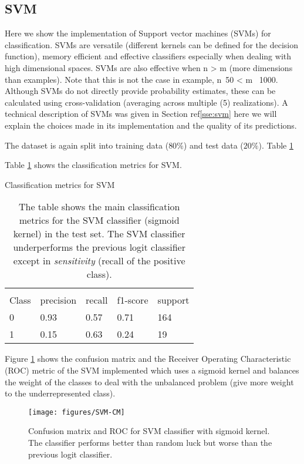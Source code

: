 \documentclass[11pt]{article}
\begin{document}
\subsection{SVM}
\label{se:ressvm}
Here we show the implementation of Support vector machines (SVMs) for classification. SVMs are versatile (different kernels can be defined for the decision function), memory efficient and effective classifiers especially when dealing with high dimensional spaces. SVMs are also effective when n > m (more dimensions than examples). Note that this is not the case in example, n~50 < m ~1000.
Although SVMs do not directly provide probability estimates, these can be calculated using cross-validation (averaging across multiple (5) realizations).
A technical description of SVMs was given in Section ref\ref{sse:svm} here we will explain the choices made in its implementation and the quality of its predictions.

The dataset is again split into training data ($80\%$) and test data ($20\%$). Table \ref{tab:svm}

Table \ref{tab:svm} shows the classification metrics for SVM.
\begin{table}[H]
\caption{Classification metrics for SVM} \label{tab:svm} 
\begin{center} 
\begin{tabular}{lllll}
\hline
\multicolumn{1}{c}{} \\
Class & precision & recall & f1-score & support     \\
\hline
0 & 0.93  &    0.57   &   0.71   &    164 \\
1 & 0.15  &    0.63   &   0.24   &    19 \\
\hline
\end{tabular}
\caption{The table shows the main classification metrics for the SVM classifier (sigmoid kernel) in the test set. The SVM classifier underperforms the previous logit classifier except in \emph{sensitivity} (recall of the positive class).}
\end{center}
\end{table}

Figure \ref{fig:svm-cm} shows the confusion matrix and the Receiver Operating Characteristic (ROC) metric of the SVM implemented which uses a sigmoid kernel and balances the weight of the classes to deal with the unbalanced problem (give more weight to the underrepresented class).
\begin{figure}[H]
        \centering
        \texttt{[image: figures/SVM-CM]}
        \caption{Confusion matrix and ROC for SVM classifier with sigmoid kernel. The classifier performs better than random luck but worse than the previous logit classifier.}
\label{fig:svm-cm}
\end{figure}
\end{document}
